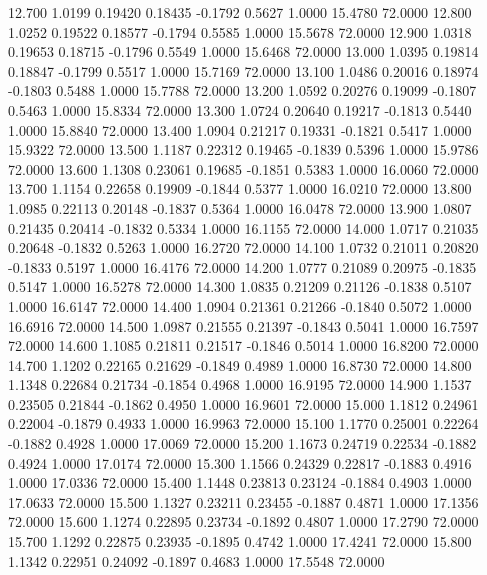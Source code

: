   12.700   1.0199   0.19420   0.18435  -0.1792   0.5627   1.0000  15.4780  72.0000
  12.800   1.0252   0.19522   0.18577  -0.1794   0.5585   1.0000  15.5678  72.0000
  12.900   1.0318   0.19653   0.18715  -0.1796   0.5549   1.0000  15.6468  72.0000
  13.000   1.0395   0.19814   0.18847  -0.1799   0.5517   1.0000  15.7169  72.0000
  13.100   1.0486   0.20016   0.18974  -0.1803   0.5488   1.0000  15.7788  72.0000
  13.200   1.0592   0.20276   0.19099  -0.1807   0.5463   1.0000  15.8334  72.0000
  13.300   1.0724   0.20640   0.19217  -0.1813   0.5440   1.0000  15.8840  72.0000
  13.400   1.0904   0.21217   0.19331  -0.1821   0.5417   1.0000  15.9322  72.0000
  13.500   1.1187   0.22312   0.19465  -0.1839   0.5396   1.0000  15.9786  72.0000
  13.600   1.1308   0.23061   0.19685  -0.1851   0.5383   1.0000  16.0060  72.0000
  13.700   1.1154   0.22658   0.19909  -0.1844   0.5377   1.0000  16.0210  72.0000
  13.800   1.0985   0.22113   0.20148  -0.1837   0.5364   1.0000  16.0478  72.0000
  13.900   1.0807   0.21435   0.20414  -0.1832   0.5334   1.0000  16.1155  72.0000
  14.000   1.0717   0.21035   0.20648  -0.1832   0.5263   1.0000  16.2720  72.0000
  14.100   1.0732   0.21011   0.20820  -0.1833   0.5197   1.0000  16.4176  72.0000
  14.200   1.0777   0.21089   0.20975  -0.1835   0.5147   1.0000  16.5278  72.0000
  14.300   1.0835   0.21209   0.21126  -0.1838   0.5107   1.0000  16.6147  72.0000
  14.400   1.0904   0.21361   0.21266  -0.1840   0.5072   1.0000  16.6916  72.0000
  14.500   1.0987   0.21555   0.21397  -0.1843   0.5041   1.0000  16.7597  72.0000
  14.600   1.1085   0.21811   0.21517  -0.1846   0.5014   1.0000  16.8200  72.0000
  14.700   1.1202   0.22165   0.21629  -0.1849   0.4989   1.0000  16.8730  72.0000
  14.800   1.1348   0.22684   0.21734  -0.1854   0.4968   1.0000  16.9195  72.0000
  14.900   1.1537   0.23505   0.21844  -0.1862   0.4950   1.0000  16.9601  72.0000
  15.000   1.1812   0.24961   0.22004  -0.1879   0.4933   1.0000  16.9963  72.0000
  15.100   1.1770   0.25001   0.22264  -0.1882   0.4928   1.0000  17.0069  72.0000
  15.200   1.1673   0.24719   0.22534  -0.1882   0.4924   1.0000  17.0174  72.0000
  15.300   1.1566   0.24329   0.22817  -0.1883   0.4916   1.0000  17.0336  72.0000
  15.400   1.1448   0.23813   0.23124  -0.1884   0.4903   1.0000  17.0633  72.0000
  15.500   1.1327   0.23211   0.23455  -0.1887   0.4871   1.0000  17.1356  72.0000
  15.600   1.1274   0.22895   0.23734  -0.1892   0.4807   1.0000  17.2790  72.0000
  15.700   1.1292   0.22875   0.23935  -0.1895   0.4742   1.0000  17.4241  72.0000
  15.800   1.1342   0.22951   0.24092  -0.1897   0.4683   1.0000  17.5548  72.0000
